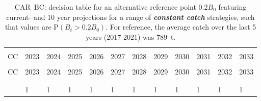 \documentclass[11pt]{book}
\newcommand{\itbf}[1]{\textit{\textbf{#1}}}
\begin{document}
\begin{longtable}[c]{>{\raggedright\let\newline\\\arraybackslash\hspace{0pt}}p{0.49in}>{\raggedleft\let\newline\\\arraybackslash\hspace{0pt}}p{0.49in}>{\raggedleft\let\newline\\\arraybackslash\hspace{0pt}}p{0.49in}>{\raggedleft\let\newline\\\arraybackslash\hspace{0pt}}p{0.49in}>{\raggedleft\let\newline\\\arraybackslash\hspace{0pt}}p{0.49in}>{\raggedleft\let\newline\\\arraybackslash\hspace{0pt}}p{0.49in}>{\raggedleft\let\newline\\\arraybackslash\hspace{0pt}}p{0.49in}>{\raggedleft\let\newline\\\arraybackslash\hspace{0pt}}p{0.56in}>{\raggedleft\let\newline\\\arraybackslash\hspace{0pt}}p{0.56in}>{\raggedleft\let\newline\\\arraybackslash\hspace{0pt}}p{0.56in}>{\raggedleft\let\newline\\\arraybackslash\hspace{0pt}}p{0.56in}>{\raggedleft\let\newline\\\arraybackslash\hspace{0pt}}p{0.56in}}
  \caption{CAR~BC: decision table for an alternative reference point $0.2 B_0$ featuring current- and 10 year projections for a range of \itbf{constant catch} strategies, such that values are P$(B_t > 0.2 B_0)$.  For reference, the average catch over the last 5 years (2017-2021) was 789~t. } \label{tab:car.gmu.20B0.CCs}\\  \hline\\[-2.2ex]  CC  & 2023 & 2024 & 2025 & 2026 & 2027 & 2028 & 2029 & 2030 & 2031 & 2032 & 2033 \\[0.2ex]\hline\\[-1.5ex]  \endfirsthead   \hline  CC  & 2023 & 2024 & 2025 & 2026 & 2027 & 2028 & 2029 & 2030 & 2031 & 2032 & 2033 \\[0.2ex]\hline\\[-1.5ex]  \endhead  \hline\\[-2.2ex]   \endfoot  \hline \endlastfoot  0 & 1 & 1 & 1 & 1 & 1 & 1 & 1 & 1 & 1 & 1 & 1 \\ 

\end{longtable}
\end{document}
